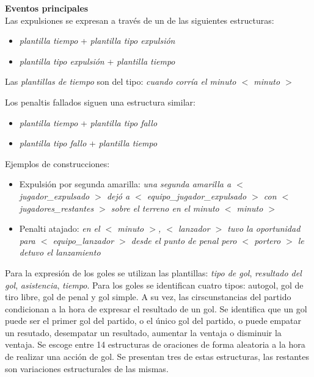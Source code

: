 \textbf{Eventos principales}\\


    Las expulsiones se expresan a través de un de las siguientes estructuras:
    \begin{itemize}
        \item \textit{plantilla tiempo} + \textit{plantilla tipo expulsión}
        \item \textit{plantilla tipo expulsión} + \textit{plantilla tiempo}
    \end{itemize}

    Las \textit{plantillas de tiempo} son del tipo: \textit{cuando corría el minuto $<$ minuto $>$}

    Los penaltis fallados siguen una estructura similar:
    \begin{itemize}
        \item \textit{plantilla tiempo} + \textit{plantilla tipo fallo}
        \item \textit{plantilla tipo fallo} + \textit{plantilla tiempo}
    \end{itemize}

    Ejemplos de construcciones: 

    \begin{itemize}
    \item Expulsión por segunda amarilla:  \textit{una segunda amarilla a $<$ jugador\_expulsado $>$ dejó 
    a $<$ equipo\_jugador\_expulsado $>$ con $<$ jugadores\_restantes $>$ sobre el terreno 
    en el minuto $<$ minuto $>$}
    
    \item Penalti atajado: \textit{en el $<$ minuto $>$, $<$ lanzador $>$ tuvo la oportunidad 
    para $<$ equipo\_lanzador $>$ desde el punto de penal pero $<$ portero $>$ le detuvo el lanzamiento}
    \end{itemize}


    Para la expresión de los goles se utilizan las plantillas: \textit{tipo de gol}, \textit{resultado del gol}, 
    \textit{asistencia}, \textit{tiempo}. Para los goles se identifican cuatro tipos: autogol, gol de tiro libre, 
    gol de penal y gol simple. A su vez, las cirscunstancias del partido condicionan a la hora de expresar el resultado 
    de un gol. Se identifica que un gol puede ser el primer gol del partido, o el único gol del partido, o puede empatar 
    un resutado, desempatar un resultado, aumentar la ventaja o disminuir la ventaja.
    Se escoge entre 14 estructuras de oraciones de forma aleatoria a la hora de realizar una acción de gol. Se presentan tres 
    de estas estructuras, las restantes son variaciones estructurales de las mismas.
    
